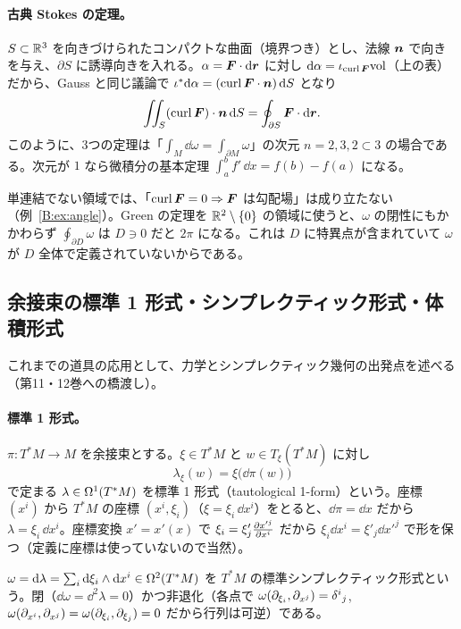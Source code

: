 \paragraph{古典 Stokes の定理。}$S\subset\mathbb R^3$ を向きづけられたコンパクトな曲面（境界つき）とし、法線 $\boldsymbol n$ で向きを与え、$\partial S$ に誘導向きを入れる。$\alpha=\boldsymbol F\cdot\mathrm{d}\boldsymbol r$ に対し $\mathrm{d}\alpha=\iota_{\operatorname{curl}\boldsymbol F}\mathrm{vol}$（上の表）だから、Gauss と同じ議論で $\iota^*\mathrm{d}\alpha=(\operatorname{curl}\boldsymbol F\cdot\boldsymbol n)\,\mathrm{d} S$ となり
\[
\iint_S(\operatorname{curl}\boldsymbol F)\cdot\boldsymbol n\,\mathrm{d} S=\oint_{\partial S}\boldsymbol F\cdot\mathrm{d}\boldsymbol r .
\]
このように、3つの定理は「$\int_M\dd\omega=\int_{\partial M}\omega$」の次元 $n=2,3,2\subset3$ の場合である。次元が $1$ なら微積分の基本定理 $\int_a^b f'\,\dd x=f(b)-f(a)$ になる。

\begin{rem}
単連結でない領域では、「$\operatorname{curl}\boldsymbol F=0\Rightarrow\boldsymbol F$ は勾配場」は成り立たない（例~\ref{B:ex:angle}）。Green の定理を $\mathbb R^2\setminus\{0\}$ の領域に使うと、$\omega$ の閉性にもかかわらず $\oint_{\partial D}\omega$ は $D\ni0$ だと $2\pi$ になる。これは $D$ に特異点が含まれていて $\omega$ が $D$ 全体で定義されていないからである。
\end{rem}

\subsection{余接束の標準 1 形式・シンプレクティック形式・体積形式}\label{B:ss:symp}

これまでの道具の応用として、力学とシンプレクティック幾何の出発点を述べる（第11・12巻への橋渡し）。

\paragraph{標準 1 形式。}$\pi:T^*M\to M$ を余接束とする。$\xi\in T^*M$ と $w\in T_\xi(T^*M)$ に対し
\[
\lambda_\xi(w)=\xi\bigl(\dd\pi(w)\bigr)
\]
で定まる $\lambda\in\Omega^1(T^*M)$ を標準 1 形式（tautological 1-form）という。座標 $(x^i)$ から $T^*M$ の座標 $(x^i,\xi_i)$（$\xi=\xi_i\,\dd x^i$）をとると、$\dd\pi=\dd x$ だから $\lambda=\xi_i\,\dd x^i$。座標変換 $x'=x'(x)$ で $\xi_i=\xi'_j\frac{\partial x'^j}{\partial x^i}$ だから $\xi_i\dd x^i=\xi'_j\dd x'^j$ で形を保つ（定義に座標は使っていないので当然）。

\begin{defn}
$\omega=\mathrm{d}\lambda=\sum_i\mathrm{d}\xi_i\wedge\mathrm{d} x^i\in\Omega^2(T^*M)$ を $T^*M$ の標準シンプレクティック形式という。閉（$\dd\omega=\dd^2\lambda=0$）かつ非退化（各点で $\omega(\partial_{\xi_i},\partial_{x^j})=\delta^i{}_j$, $\omega(\partial_{x^i},\partial_{x^j})=\omega(\partial_{\xi_i},\partial_{\xi_j})=0$ だから行列は可逆）である。
\end{defn}


